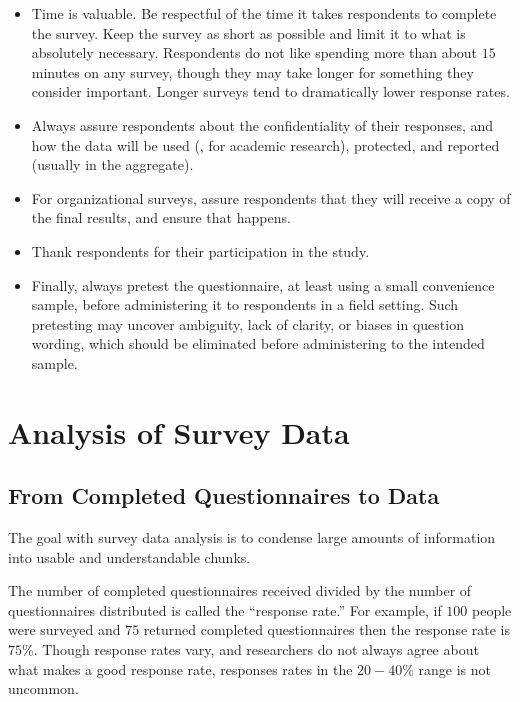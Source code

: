 \begin{itemize}
	\item Time is valuable. Be respectful of the time it takes respondents to complete the survey. Keep the survey as short as possible and limit it to what is absolutely necessary. Respondents do not like spending more than about $ 15 $ minutes on any survey, though they may take longer for something they consider important. Longer surveys tend to dramatically lower response rates.

	\item Always assure respondents about the confidentiality of their responses, and how the data will be used (\eg, for academic research), protected, and reported (usually in the aggregate).

	\item For organizational surveys, assure respondents that they will receive a copy of the final results, and ensure that happens.

	\item Thank respondents for their participation in the study.

	\item Finally, always pretest the questionnaire, at least using a small convenience sample, before administering it to respondents in a field setting. Such pretesting may uncover ambiguity, lack of clarity, or biases in question wording, which should be eliminated before administering to the intended sample.
\end{itemize}

\section{Analysis of Survey Data}\label{08:analysisOfSurveyData}

\subsection{From Completed Questionnaires to Data}

The goal with survey data analysis is to condense large amounts of information into usable and understandable chunks. 

The number of completed questionnaires received divided by the number of questionnaires  distributed is called the ``response rate.'' For example, if $ 100 $ people were surveyed and $ 75 $ returned completed questionnaires then the response rate is $ 75\% $. Though response rates vary, and researchers do not always agree about what makes a good response rate, responses rates in the $ 20-40\% $ range is not uncommon. 

